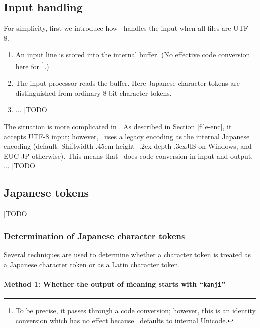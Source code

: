 \documentclass[a4paper,11pt,dvipdfmx]{article}
\def\_{\leavevmode\vrule width .45em height -.2ex depth .3ex\relax}
\begin{document}
\subsection{Input handling}

For simplicity, first we introduce how \upTeX\ handles the input
when all files are UTF-8.
\begin{enumerate}
 \item An input line is stored into the internal buffer.
   (No effective code conversion here for \upTeX\footnote{To be precise,
   it passes through a code conversion; however, this is an identity conversion
   which has no effect because \upTeX\ defaults to internal Unicode.}.)
 \item The input processor reads the buffer.
   Here Japanese character tokens are distinguished from
   ordinary 8-bit character tokens.
 \item ... [TODO]
\end{enumerate}

The situation is more complicated in \pTeX.
As described in Section \ref{file-enc}, it accepts UTF-8 input;
however, \pTeX\ uses a legacy encoding as the internal Japanese encoding
(default: Shift\_JIS on Windows, and EUC-JP otherwise).
This means that \pTeX\ does code conversion in input and output.
... [TODO]

\subsection{Japanese tokens}

[TODO]

\subsubsection{Determination of Japanese character tokens}

Several techniques are used to determine whether a character token is treated as
a Japanese character token or as a Latin character token.

\paragraph{Method 1: Whether the output of \.{meaning} starts with ``\texttt{kanji\textvisiblespace}''}
\end{document}
